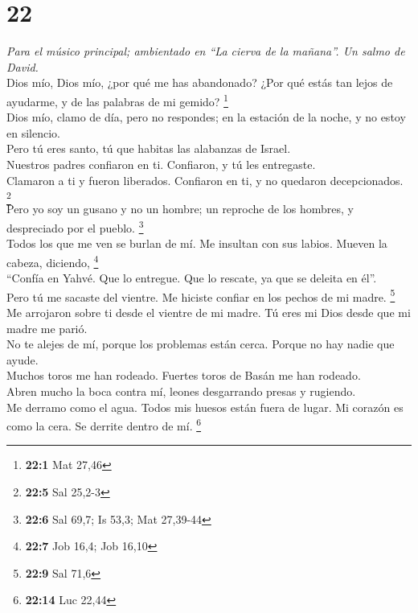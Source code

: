\hypertarget{section-21}{%
\section{22}\label{section-21}}

\emph{Para el músico principal; ambientado en ``La cierva de la
mañana''. Un salmo de David.}\\
 Dios mío, Dios mío, ¿por qué me has abandonado? ¿Por qué
estás tan lejos de ayudarme, y de las palabras de mi gemido?
\footnote{\textbf{22:1} Mat 27,46}\\
 Dios mío, clamo de día, pero no respondes; en la estación
de la noche, y no estoy en silencio.\\
 Pero tú eres santo, tú que habitas las alabanzas de
Israel.\\
 Nuestros padres confiaron en ti. Confiaron, y tú les
entregaste.\\
 Clamaron a ti y fueron liberados. Confiaron en ti, y no
quedaron decepcionados. \footnote{\textbf{22:5} Sal 25,2-3}\\
 Pero yo soy un gusano y no un hombre; un reproche de los
hombres, y despreciado por el pueblo. \footnote{\textbf{22:6} Sal 69,7;
  Is 53,3; Mat 27,39-44}\\
 Todos los que me ven se burlan de mí. Me insultan con sus
labios. Mueven la cabeza, diciendo, \footnote{\textbf{22:7} Job 16,4;
  Job 16,10}\\
 ``Confía en Yahvé. Que lo entregue. Que lo rescate, ya
que se deleita en él''.\\
 Pero tú me sacaste del vientre. Me hiciste confiar en los
pechos de mi madre. \footnote{\textbf{22:9} Sal 71,6}\\
 Me arrojaron sobre ti desde el vientre de mi madre. Tú
eres mi Dios desde que mi madre me parió.\\
 No te alejes de mí, porque los problemas están cerca.
Porque no hay nadie que ayude.\\
 Muchos toros me han rodeado. Fuertes toros de Basán me
han rodeado.\\
 Abren mucho la boca contra mí, leones desgarrando presas
y rugiendo.\\
 Me derramo como el agua. Todos mis huesos están fuera de
lugar. Mi corazón es como la cera. Se derrite dentro de mí.
\footnote{\textbf{22:14} Luc 22,44}\\
